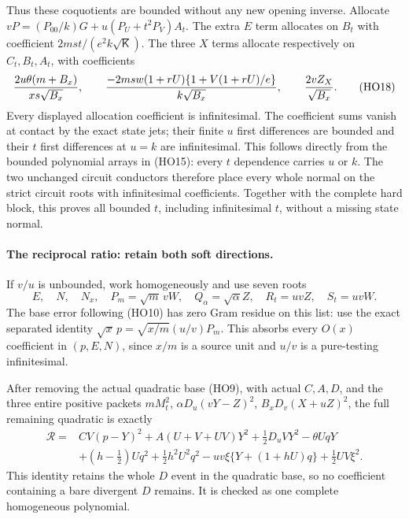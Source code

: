 Thus these coquotients are bounded without any new opening inverse.
Allocate $vP=(P_{00}/k)G+u(P_U+t^2P_V)A_t$.
The extra $E$ term allocates on $B_t$ with coefficient
$2mst/(e^2k\sqrt{\mathsf K})$.
The three $X$ terms allocate respectively on $C_t,B_t,A_t$,
with coefficients
\[
 {2u\theta(m+B_x)\over xs\sqrt{B_x}},\qquad
 {-2msw(1+rU)\{1+V(1+rU)/e\}\over k\sqrt{B_x}},\qquad
 {2vZ_X\over\sqrt{B_x}} .
 \tag{HO18}
\]
Every displayed allocation coefficient is infinitesimal.
The coefficient sums vanish at contact by the exact state jets;
their finite $u$ first differences are bounded and their $t$
first differences at $u=k$ are infinitesimal.
This follows directly from the bounded polynomial arrays in
(HO15): every $t$ dependence carries $u$ or $k$.
The two unchanged circuit conductors therefore place every whole
normal on the strict circuit roots with infinitesimal coefficients.
Together with the complete hard block, this proves all bounded $t$,
including infinitesimal $t$, without a missing state normal.

\paragraph{The reciprocal ratio: retain both soft directions.}
If $v/u$ is unbounded, work homogeneously and use seven roots
\[
 E,\quad N,\quad N_x,\quad
 P_m=\sqrt m\,vW,\quad Q_\alpha=\sqrt\alpha Z,\quad
 R_t=uvZ,\quad S_t=uvW .
 \tag{HO19}
\]
The base error following (HO10) has zero Gram residue on this list:
use the exact separated identity
$\sqrt x\,p=\sqrt{x/m}(u/v)P_m$.
This absorbs every $O(x)$ coefficient in $(p,E,N)$, since $x/m$
is a source unit and $u/v$ is a pure-testing infinitesimal.

After removing the actual quadratic base (HO9), with actual $C,A,D$,
and the three entire positive packets
$mM_t^2$, $\alpha D_u(vY-Z)^2$,
$B_xD_v(X+uZ)^2$, the full remaining quadratic is exactly
\[
 \begin{split}
 \mathcal R={}&CV(p-Y)^2+A(U+V+UV)Y^2
                      +\tfrac12D_uVY^2-\theta UqY\\
 &+(h-\tfrac12)Uq^2+\tfrac12h^2U^2q^2
       -uv\xi\{Y+(1+hU)q\}+\tfrac12UV\xi^2 .
 \end{split}
 \tag{HO20}
\]
This identity retains the whole $D$ event in the quadratic base,
so no coefficient containing a bare divergent $D$ remains.
It is checked as one complete homogeneous polynomial.

